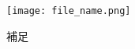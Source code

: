 \begin{figure}[htbp]
    \begin{center}
        \texttt{[image: file\_name.png]}
        \caption{補足}
    \end{center}
\end{figure}